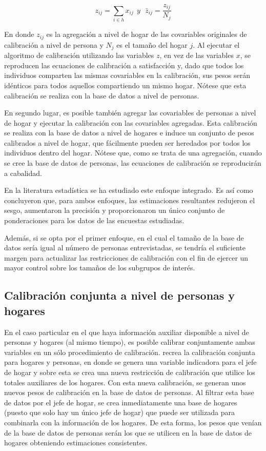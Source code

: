 \documentclass[
  10pt,
  spanish,
]{book}
\begin{document}
\[
z_{ij}=\sum_{i\in h} x_{ij}\ \ y\ \ \ {\bar{z}}_{ij}=\frac{z_{ij}}{N_j}
\]

En donde \(z_{ij}\) es la agregación a nivel de hogar de las covariables originales de calibración a nivel de persona y \(N_j\) es el tamaño del hogar \(j\). Al ejecutar el algoritmo de calibración utilizando las variables \(z\), en vez de las variables \(x\), se reproducen las ecuaciones de calibración a satisfacción y, dado que todos los individuos comparten las mismas covariables en la calibración, sus pesos serán idénticos para todos aquellos compartiendo un mismo hogar. Nótese que esta calibración se realiza con la base de datos a nivel de personas.

En segundo lugar, es posible también agregar las covariables de personas a nivel de hogar y ejecutar la calibración con las covariables agregadas. Esta calibración se realiza con la base de datos a nivel de hogares e induce un conjunto de pesos calibrados a nivel de hogar, que fácilmente pueden ser heredados por todos los individuos dentro del hogar. Nótese que, como se trata de una agregación, cuando se cree la base de datos de personas, las ecuaciones de calibración se reproducirán a cabalidad.

En la literatura estadística se ha estudiado este enfoque integrado. Es así como \citet{Neethling_Galpin_2006} concluyeron que, para ambos enfoques, las estimaciones resultantes redujeron el sesgo, aumentaron la precisión y proporcionaron un único conjunto de ponderaciones para los datos de las encuestas estudiadas.

Además, si se opta por el primer enfoque, en el cual el tamaño de la base de datos sería igual al número de personas entrevistadas, se tendría el suficiente margen para actualizar las restricciones de calibración con el fin de ejercer un mayor control sobre los tamaños de los subgrupos de interés.

\hypertarget{calibraciuxf3n-conjunta-a-nivel-de-personas-y-hogares}{%
\subsection{Calibración conjunta a nivel de personas y hogares}\label{calibraciuxf3n-conjunta-a-nivel-de-personas-y-hogares}}

En el caso particular en el que haya información auxiliar disponible a nivel de personas y hogares (al mismo tiempo), es posible calibrar conjuntamente ambas variables en un sólo procedimiento de calibración. \citet[sec.~5]{Estevao_Sarndal_2006} recrea la calibración conjunta para hogares y personas, en donde se genera una variable indicadora para el jefe de hogar y sobre esta se crea una nueva restricción de calibración que utilice los totales auxiliares de los hogares. Con esta nueva calibración, se generan unos nuevos pesos de calibración en la base de datos de personas. Al filtrar esta base de datos por el jefe de hogar, se crea inmediatamente una base de hogares (puesto que solo hay un único jefe de hogar) que puede ser utilizada para combinarla con la información de los hogares. De esta forma, los pesos que venían de la base de datos de personas serán los que se utilicen en la base de datos de hogares obteniendo estimaciones consistentes.
\end{document}

